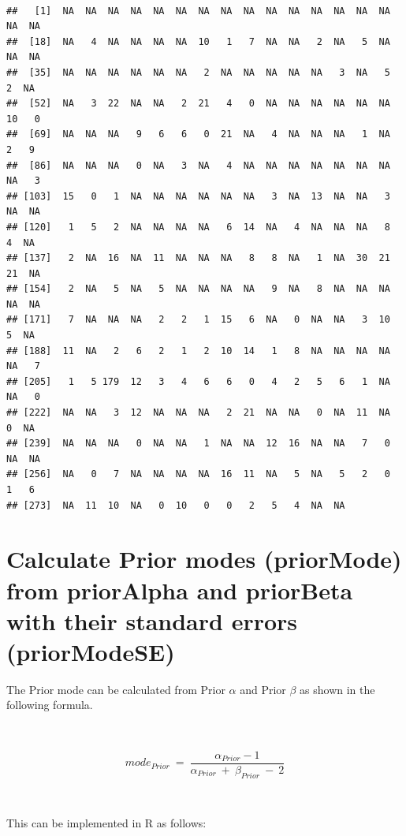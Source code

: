 \documentclass[12pt,a4paper]{article}
\newenvironment{Shaded}{\begin{snugshade}}{\end{snugshade}}
\newcommand{\DecValTok}[1]{\textcolor[rgb]{0.00,0.00,0.81}{#1}}
\newcommand{\StringTok}[1]{\textcolor[rgb]{0.31,0.60,0.02}{#1}}
\newcommand{\OperatorTok}[1]{\textcolor[rgb]{0.81,0.36,0.00}{\textbf{#1}}}
\newcommand{\NormalTok}[1]{#1}
\begin{document}
~

\begin{verbatim}
##   [1]  NA  NA  NA  NA  NA  NA  NA  NA  NA  NA  NA  NA  NA  NA  NA  NA  NA
##  [18]  NA   4  NA  NA  NA  NA  10   1   7  NA  NA   2  NA   5  NA  NA  NA
##  [35]  NA  NA  NA  NA  NA  NA   2  NA  NA  NA  NA  NA   3  NA   5   2  NA
##  [52]  NA   3  22  NA  NA   2  21   4   0  NA  NA  NA  NA  NA  NA  10   0
##  [69]  NA  NA  NA   9   6   6   0  21  NA   4  NA  NA  NA   1  NA   2   9
##  [86]  NA  NA  NA   0  NA   3  NA   4  NA  NA  NA  NA  NA  NA  NA  NA   3
## [103]  15   0   1  NA  NA  NA  NA  NA  NA   3  NA  13  NA  NA   3  NA  NA
## [120]   1   5   2  NA  NA  NA  NA   6  14  NA   4  NA  NA  NA   8   4  NA
## [137]   2  NA  16  NA  11  NA  NA  NA   8   8  NA   1  NA  30  21  21  NA
## [154]   2  NA   5  NA   5  NA  NA  NA  NA   9  NA   8  NA  NA  NA  NA  NA
## [171]   7  NA  NA  NA   2   2   1  15   6  NA   0  NA  NA   3  10   5  NA
## [188]  11  NA   2   6   2   1   2  10  14   1   8  NA  NA  NA  NA  NA   7
## [205]   1   5 179  12   3   4   6   6   0   4   2   5   6   1  NA  NA   0
## [222]  NA  NA   3  12  NA  NA  NA   2  21  NA  NA   0  NA  11  NA   0  NA
## [239]  NA  NA  NA   0  NA  NA   1  NA  NA  12  16  NA  NA   7   0  NA  NA
## [256]  NA   0   7  NA  NA  NA  NA  16  11  NA   5  NA   5   2   0   1   6
## [273]  NA  11  10  NA   0  10   0   0   2   5   4  NA  NA
\end{verbatim}

\newpage

\hypertarget{calculate-prior-modes-priormode-from-prioralpha-and-priorbeta-with-their-standard-errors-priormodese}{%
\section{Calculate Prior modes (priorMode) from priorAlpha and priorBeta
with their standard errors
(priorModeSE)}\label{calculate-prior-modes-priormode-from-prioralpha-and-priorbeta-with-their-standard-errors-priormodese}}

The Prior mode can be calculated from Prior \(\alpha\) and Prior
\(\beta\) as shown in the following formula.

~

\[ mode_{Prior} ~ = ~ \frac{\alpha_{Prior} - 1}{\alpha_{Prior} ~ + ~ \beta_{Prior} ~ - ~ 2} \]

~

This can be implemented in R as follows:

~

\begin{Shaded}
\end{Shaded}
\end{document}
